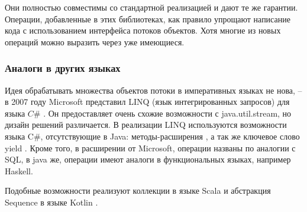 Они полностью совместимы со стандартной реализацией и дают те же гарантии. Операции, добавленные в этих библиотеках, как правило упрощают написание кода с использованием интерфейса потоков объектов. Хотя многие из новых операций можно выразить через уже имеющиеся.

\subsubsection{Аналоги в других языках}
Идея обрабатывать множества объектов  потоки в императивных языках не нова, -- в 2007 году Microsoft представил LINQ (язык интегрированных запросов) для языка $C\#$ \cite{ms:linq}. Он предоставляет очень схожие возможности с java.util.stream, но дизайн решений различается. В реализации LINQ используются возможности языка C\#, отсутствующие в Java: методы-расширения \cite{ms:ext}, а так же ключевое слово yield \cite{ms:yield}. Кроме того, в расширении от Microsoft, операции названы по аналогии с SQL, в java же, операции имеют аналоги в функциональных языках, например Haskell.

Подобные возможности реализуют коллекции в языке Scala \cite{ho:scala} и абстракция Sequence в языке Kotlin \cite{ho:kotlin}.